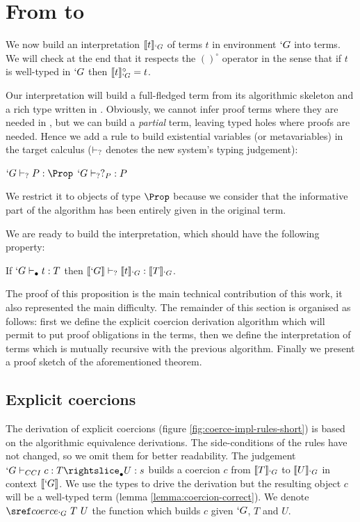 \documentclass{llncs}
\begin{document}
\section{From \lng{} to \CICq{}}
\label{sec:Translation}
We now build an interpretation
$\llbracket t \rrbracket_{`G}$ of \Russell terms $t$ in environment $`G$ into \CIC
terms. We will check at the end that it respects the $()^{\circ}$ operator
in the sense that if $t$ is well-typed in $`G$ then $\llbracket t \rrbracket_{`G}^{\circ} = t$.

Our interpretation will build a full-fledged \CIC term from its
algorithmic skeleton and a rich type written in \Russell. Obviously, we
cannot infer proof terms where they are needed in \CIC, but we can build
a \emph{partial} term, leaving typed holes where proofs are
needed. Hence we add a rule to build existential variables (or
metavariables) in the target calculus ($\vdash_{?}$ denotes the new system's typing judgement):

\begin{center}  
  \UAX{}
  {$`G \typeq P : \Prop$}
  {$`G \vdash_{?} ?_{P} : P$}
  {}
  \DP
  \vspace{-0.2em}
\end{center}
We restrict it to objects of type $\Prop$ because we consider that the
informative part of the algorithm has been entirely given in the
original term. 

We are ready to build the interpretation, which should have the following property:
\begin{theorem}
  \label{interp-correct}
  If $`G \vdash_{\bullet} t : T$ then $\llbracket `G \rrbracket \vdash_{?} \llbracket t \rrbracket_{`G} : \llbracket T \rrbracket_{`G}$.
\end{theorem}

The proof of this proposition is the main technical contribution of this
work, it also represented the main difficulty. 
The remainder of this section is organised as follows: first we 
define the explicit coercion derivation algorithm which will permit to
put proof obligations in the terms, then we define the
interpretation of terms which is mutually recursive with the previous
algorithm. Finally we present a proof sketch of the aforementioned
theorem.

\subsection{Explicit coercions}
The derivation of explicit coercions (figure
\vref{fig:coerce-impl-rules-short}) is based on the
algorithmic equivalence derivations.  
The side-conditions of the rules have not changed, so we omit them for
better readability. The judgement $\subimpl{`G}{c}{T}{U}{s}$ builds a
coercion $c$ from $\llbracket T \rrbracket_{`G}$ to $\llbracket U \rrbracket_{`G}$ in context $\llbracket `G \rrbracket$.
We use the \lng{} types to drive the
derivation but the resulting object $c$ will be a well-typed \Coq{} term
(lemma \ref{lemma:coercion-correct}). We denote $\coerce{`G}{T}{U}$
the function which builds $c$ given $`G$, $T$ and $U$.
\end{document}
